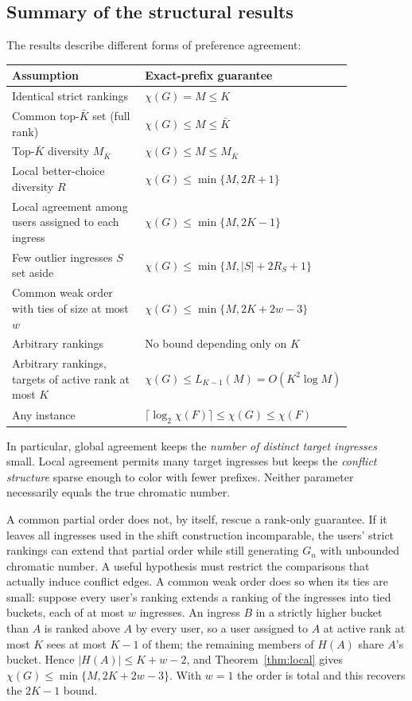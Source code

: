 \documentclass[10pt,a4paper]{article}
\begin{document}
\subsection{Summary of the structural results}

The results describe different forms of preference agreement:
\begin{center}
\small
\begin{tabular}{@{}p{0.40\linewidth}p{0.45\linewidth}@{}}
\toprule
\textbf{Assumption} & \textbf{Exact-prefix guarantee}\\
\midrule
Identical strict rankings & $\chi(G)=M\le K$\\
Common top-$\bar K$ set (full rank) & $\chi(G)\le M\le \bar K$\\
Top-$\bar K$ diversity $M_{\bar K}$ & $\chi(G)\le M\le M_{\bar K}$\\
Local better-choice diversity $R$ & $\chi(G)\le\min\{M,2R+1\}$\\
Local agreement among users assigned to each ingress & $\chi(G)\le\min\{M,2K-1\}$\\
Few outlier ingresses $S$ set aside & $\chi(G)\le\min\{M,|S|+2R_S+1\}$\\
Common weak order with ties of size at most $w$ & $\chi(G)\le\min\{M,2K+2w-3\}$\\
Arbitrary rankings & No bound depending only on $K$\\
Arbitrary rankings, targets of active rank at most $K$ & $\chi(G)\le L_{K-1}(M)=O(K^2\log M)$\\
Any instance & $\lceil\log_2\chi(F)\rceil\le\chi(G)\le\chi(F)$\\
\bottomrule
\end{tabular}
\end{center}
In particular, global agreement keeps the \emph{number of distinct target ingresses} small. Local agreement permits many target ingresses but keeps the \emph{conflict structure} sparse enough to color with fewer prefixes. Neither parameter necessarily equals the true chromatic number.

A common partial order does not, by itself, rescue a rank-only guarantee. If it leaves all ingresses used in the shift construction incomparable, the users' strict rankings can extend that partial order while still generating $G_n$ with unbounded chromatic number. A useful hypothesis must restrict the comparisons that actually induce conflict edges. A common weak order does so when its ties are small: suppose every user's ranking extends a ranking of the ingresses into tied buckets, each of at most $w$ ingresses. An ingress $B$ in a strictly higher bucket than $A$ is ranked above $A$ by every user, so a user assigned to $A$ at active rank at most $K$ sees at most $K-1$ of them; the remaining members of $H(A)$ share $A$'s bucket. Hence $|H(A)|\le K+w-2$, and Theorem~\ref{thm:local} gives $\chi(G)\le\min\{M,2K+2w-3\}$. With $w=1$ the order is total and this recovers the $2K-1$ bound.
\end{document}
